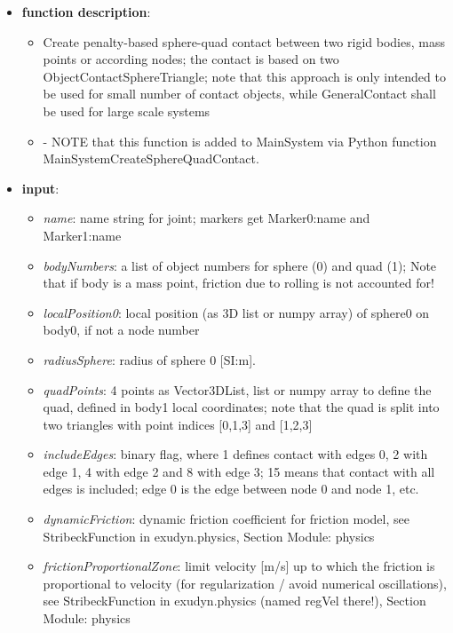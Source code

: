 \begin{itemize}[leftmargin=0.7cm]
\item[--]
{\bf function description}: \vspace{-6pt}
\begin{itemize}[leftmargin=1.2cm]
\setlength{\itemindent}{-0.7cm}
\item[]Create penalty-based sphere-quad contact between two rigid bodies, mass points or according nodes; the contact is based on two ObjectContactSphereTriangle; note that this approach is only intended to be used for small number of contact objects, while GeneralContact shall be used for large scale systems
\item[]- NOTE that this function is added to MainSystem via Python function MainSystemCreateSphereQuadContact.
\end{itemize}
\item[--]
{\bf input}: \vspace{-6pt}
\begin{itemize}[leftmargin=1.2cm]
\setlength{\itemindent}{-0.7cm}
\item[]{\it name}: name string for joint; markers get Marker0:name and Marker1:name
\item[]{\it bodyNumbers}: a list of object numbers for sphere (0) and quad (1); Note that if body is a mass point, friction due to rolling is not accounted for!
\item[]{\it localPosition0}: local position (as 3D list or numpy array) of sphere0 on body0, if not a node number
\item[]{\it radiusSphere}: radius of sphere 0 [SI:m].
\item[]{\it quadPoints}: 4 points as Vector3DList, list or numpy array to define the quad, defined in body1 local coordinates; note that the quad is split into two triangles with point indices [0,1,3] and [1,2,3]
\item[]{\it includeEdges}: binary flag, where 1 defines contact with edges 0, 2 with edge 1, 4 with edge 2 and 8 with edge 3; 15 means that contact with all edges is included; edge 0 is the edge between node 0 and node 1, etc.
\item[]{\it dynamicFriction}: dynamic friction coefficient for friction model, see StribeckFunction in exudyn.physics, Section Module: physics
\item[]{\it frictionProportionalZone}: limit velocity [m/s] up to which the friction is proportional to velocity (for regularization / avoid numerical oscillations), see StribeckFunction in exudyn.physics (named regVel there!), Section Module: physics

\end{itemize}
\end{itemize}
